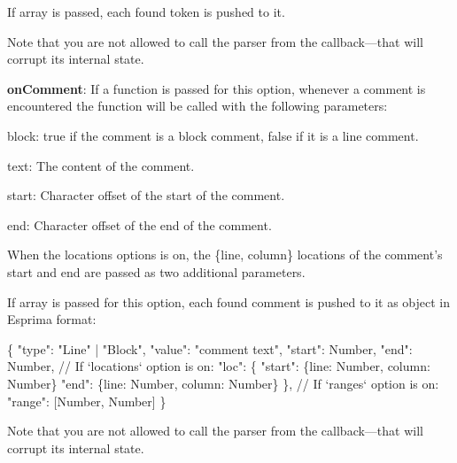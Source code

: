 \begin{DoxyItemize}
If array is passed, each found token is pushed to it.

Note that you are not allowed to call the parser from the callback—that will corrupt its internal state.
\item {\bfseries on\+Comment}\+: If a function is passed for this option, whenever a comment is encountered the function will be called with the following parameters\+:
\begin{DoxyItemize}
\item {\ttfamily block}\+: {\ttfamily true} if the comment is a block comment, false if it is a line comment.
\item {\ttfamily text}\+: The content of the comment.
\item {\ttfamily start}\+: Character offset of the start of the comment.
\item {\ttfamily end}\+: Character offset of the end of the comment.
\end{DoxyItemize}

When the {\ttfamily locations} options is on, the {\ttfamily \{line, column\}} locations of the comment’s start and end are passed as two additional parameters.

If array is passed for this option, each found comment is pushed to it as object in Esprima format\+:
\end{DoxyItemize}


\begin{DoxyCode}
\{
  "type": "Line" | "Block",
  "value": "comment text",
  "start": Number,
  "end": Number,
  // If `locations` option is on:
  "loc": \{
    "start": \{line: Number, column: Number\}
    "end": \{line: Number, column: Number\}
  \},
  // If `ranges` option is on:
  "range": [Number, Number]
\}
\end{DoxyCode}


Note that you are not allowed to call the parser from the callback—that will corrupt its internal state.


